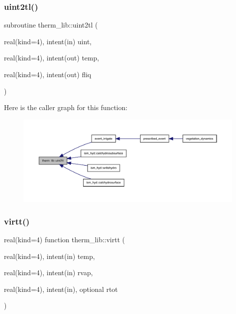 \subsubsection{\texorpdfstring{uint2tl()}{uint2tl()}}
{\footnotesize\ttfamily subroutine therm\+\_\+lib\+::uint2tl (\begin{DoxyParamCaption}\item[{real(kind=4), intent(in)}]{uint,  }\item[{real(kind=4), intent(out)}]{temp,  }\item[{real(kind=4), intent(out)}]{fliq }\end{DoxyParamCaption})}

Here is the caller graph for this function\+:
\nopagebreak
\begin{figure}[H]
\begin{center}
\leavevmode
\includegraphics[width=350pt]{namespacetherm__lib_a6ded17767672913967afa919fef33015_icgraph}
\end{center}
\end{figure}
\mbox{\label{namespacetherm__lib_adfb18489c8037340578e62f5643197f7}} 
\subsubsection{\texorpdfstring{virtt()}{virtt()}}
{\footnotesize\ttfamily real(kind=4) function therm\+\_\+lib\+::virtt (\begin{DoxyParamCaption}\item[{real(kind=4), intent(in)}]{temp,  }\item[{real(kind=4), intent(in)}]{rvap,  }\item[{real(kind=4), intent(in), optional}]{rtot }\end{DoxyParamCaption})}

